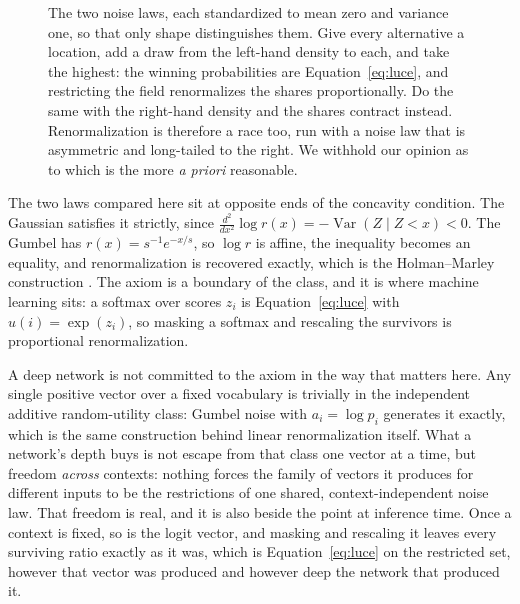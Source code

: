 \documentclass[11pt]{article}
\begin{document}
\begin{figure}[t]
\caption{The two noise laws, each standardized to mean zero and variance one, so that only
shape distinguishes them. Give every alternative a location, add a draw from the left-hand
density to each, and take the highest: the winning probabilities are Equation~\eqref{eq:luce},
and restricting the field renormalizes the shares proportionally. Do the same with the
right-hand density and the shares contract instead. Renormalization is therefore a race too,
run with a noise law that is asymmetric and long-tailed to the right. We
withhold our opinion as to which is the more \emph{a priori} reasonable.}
\label{fig:noise}
\end{figure}

The two laws compared here sit at opposite ends of the concavity condition. The Gaussian
satisfies it strictly, since
$\frac{d^2}{dx^2}\log r(x) = -\operatorname{Var}(Z \mid Z < x) < 0$. The Gumbel has
$r(x) = s^{-1}e^{-x/s}$, so $\log r$ is affine, the inequality becomes an equality, and
renormalization is recovered exactly, which is the Holman--Marley construction
\cite{lucesuppes1965,holman1974}. The axiom is a boundary of the class, and it is where
machine learning sits: a softmax over scores $z_i$ is Equation~\eqref{eq:luce} with
$u(i) = \exp(z_i)$, so masking a softmax and rescaling the survivors is proportional
renormalization.

A deep network is not committed to the axiom in the way that matters here. Any single
positive vector over a fixed vocabulary is trivially in the independent additive random-utility
class: Gumbel noise with $a_i = \log p_i$ generates it exactly, which is the same construction
behind linear renormalization itself. What a network's depth buys is not escape from that class
one vector at a time, but freedom \emph{across} contexts: nothing forces the family of vectors
it produces for different inputs to be the restrictions of one shared, context-independent noise
law. That freedom is real, and it is also beside the point at inference time. Once a context is
fixed, so is the logit vector, and masking and rescaling it leaves every surviving ratio exactly
as it was, which is Equation~\eqref{eq:luce} on the restricted set, however that vector was
produced and however deep the network that produced it.
\end{document}
